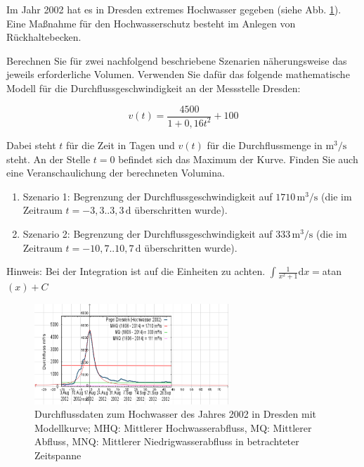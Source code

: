 Im Jahr 2002 hat es in Dresden extremes Hochwasser gegeben (siehe Abb. \ref{fig1}). Eine Maßnahme für den Hochwasserschutz besteht im Anlegen von Rückhaltebecken. 

Berechnen Sie für zwei nachfolgend beschriebene Szenarien näherungsweise das jeweils erforderliche Volumen. Verwenden Sie dafür das folgende mathematische Modell für die Durchflussgeschwindigkeit an der Messstelle Dresden:

$$v(t)=\frac{4500}{1+0,16t^2}+100$$

Dabei steht $t$ für die Zeit in Tagen und $v(t)$ für die Durchflussmenge in $\text{m}^3/\text{s}$ steht. An der Stelle $t=0$ befindet sich das Maximum  der Kurve. Finden Sie auch eine Veranschaulichung der berechneten Volumina.

\begin{enumerate}[label=(\roman*)]

\item Szenario 1: Begrenzung der Durchflussgeschwindigkeit auf $1710\, \text{m}^3/\text{s}$ (die im Zeitraum $t=-3,3..3,3\,\text{d}$
überschritten wurde).

\item Szenario 2: Begrenzung der Durchflussgeschwindigkeit auf $333\, \text{m}^3/\text{s}$ (die im Zeitraum $t=-10,7..10,7\,\text{d}$
überschritten wurde).

\end{enumerate}

Hinweis: Bei der Integration ist auf die Einheiten zu achten. $\int \frac{1}{x^2+1}$d$x=$atan$(x)+C$

\begin{figure}[ht]
	\centering
  \includegraphics[width=0.65\textwidth]{../tex-snippets/ex-fn-model-1-img-a.png}
	\caption{Durchflussdaten zum Hochwasser des Jahres 2002 in Dresden mit Modellkurve; MHQ: Mittlerer Hochwasserabfluss, MQ: Mittlerer Abfluss, MNQ: Mittlerer Niedrigwasserabfluss in betrachteter Zeitspanne }
	\label{fig1}
\end{figure}


